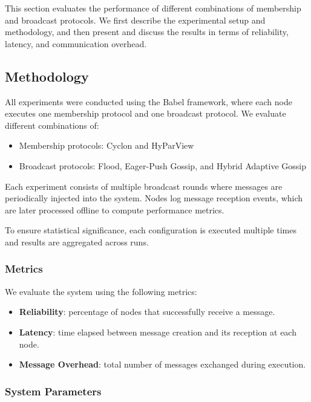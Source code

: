 \documentclass[sigconf,a4paper]{acmart}
\begin{document}
This section evaluates the performance of different combinations of
membership and broadcast protocols. We first describe the experimental
setup and methodology, and then present and discuss the results in terms
of reliability, latency, and communication overhead.

\subsection{Methodology}

All experiments were conducted using the Babel framework, where each node
executes one membership protocol and one broadcast protocol. We evaluate
different combinations of:

\begin{itemize}
    \item Membership protocols: Cyclon and HyParView
    \item Broadcast protocols: Flood, Eager-Push Gossip, and Hybrid Adaptive Gossip
\end{itemize}

Each experiment consists of multiple broadcast rounds where messages are
periodically injected into the system. Nodes log message reception events,
which are later processed offline to compute performance metrics.

To ensure statistical significance, each configuration is executed multiple
times and results are aggregated across runs.

\subsubsection{Metrics}

We evaluate the system using the following metrics:

\begin{itemize}
    \item \textbf{Reliability}: percentage of nodes that successfully receive a message.
    \item \textbf{Latency}: time elapsed between message creation and its reception at each node.
    \item \textbf{Message Overhead}: total number of messages exchanged during execution.
\end{itemize}

\subsubsection{System Parameters}
\end{document}
